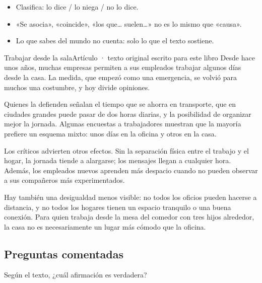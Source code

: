 
\begin{regla}
\begin{itemize}
  \item Clasifica: lo dice / lo niega / no lo dice.
  \item «Se asocia», «coincide», «los que… suelen…» no es lo mismo que «causa».
  \item Lo que sabes del mundo no cuenta: solo lo que el texto sostiene.
\end{itemize}
\end{regla}

\begin{texto}{Trabajar desde la sala}{Artículo · texto original escrito para este libro}
\pa Desde hace unos años, muchas empresas permiten a sus empleados trabajar algunos días desde la casa. La medida, que
empezó como una emergencia, se volvió para muchos una costumbre, y hoy divide opiniones.

\pa Quienes la defienden señalan el tiempo que se ahorra en transporte, que en ciudades grandes puede pasar de dos horas
diarias, y la posibilidad de organizar mejor la jornada. Algunas encuestas a trabajadores muestran que la mayoría prefiere
un esquema mixto: unos días en la oficina y otros en la casa.

\pa Los críticos advierten otros efectos. Sin la separación física entre el trabajo y el hogar, la jornada tiende a
alargarse; los mensajes llegan a cualquier hora. Además, los empleados nuevos aprenden más despacio cuando no pueden
observar a sus compañeros más experimentados.

\pa Hay también una desigualdad menos visible: no todos los oficios pueden hacerse a distancia, y no todos los hogares
tienen un espacio tranquilo o una buena conexión. Para quien trabaja desde la mesa del comedor con tres hijos alrededor,
la casa no es necesariamente un lugar más cómodo que la oficina.
\end{texto}

\subsection{Preguntas comentadas}
\begin{comentada}{Según el texto, ¿cuál afirmación es verdadera?}
\end{comentada}

